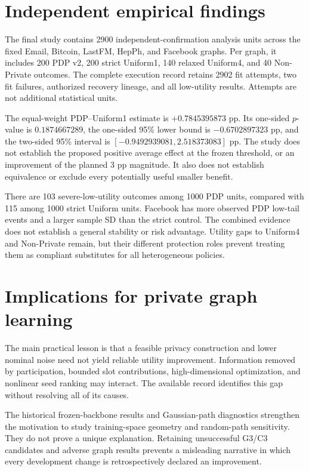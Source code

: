 \section{Independent empirical findings}
The final study contains 2900 independent-confirmation analysis units across the fixed Email, Bitcoin, LastFM, HepPh, and Facebook graphs. Per graph, it includes 200 PDP v2, 200 strict Uniform1, 140 relaxed Uniform4, and 40 Non-Private outcomes. The complete execution record retains 2902 fit attempts, two fit failures, authorized recovery lineage, and all low-utility results. Attempts are not additional statistical units.

The equal-weight PDP--Uniform1 estimate is $+0.7845395873$ pp. Its one-sided $p$-value is $0.1874667289$, the one-sided 95\% lower bound is $-0.6702897323$ pp, and the two-sided 95\% interval is $[-0.9492939081,2.518373083]$ pp. The study does not establish the proposed positive average effect at the frozen threshold, or an improvement of the planned 3 pp magnitude. It also does not establish equivalence or exclude every potentially useful smaller benefit.

There are 103 severe-low-utility outcomes among 1000 PDP units, compared with 115 among 1000 strict Uniform units. Facebook has more observed PDP low-tail events and a larger sample SD than the strict control. The combined evidence does not establish a general stability or risk advantage. Utility gaps to Uniform4 and Non-Private remain, but their different protection roles prevent treating them as compliant substitutes for all heterogeneous policies.

\section{Implications for private graph learning}
The main practical lesson is that a feasible privacy construction and lower nominal noise need not yield reliable utility improvement. Information removed by participation, bounded slot contributions, high-dimensional optimization, and nonlinear seed ranking may interact. The available record identifies this gap without resolving all of its causes.

The historical frozen-backbone results and Gaussian-path diagnostics strengthen the motivation to study training-space geometry and random-path sensitivity. They do not prove a unique explanation. Retaining unsuccessful G3/C3 candidates and adverse graph results prevents a misleading narrative in which every development change is retrospectively declared an improvement.

